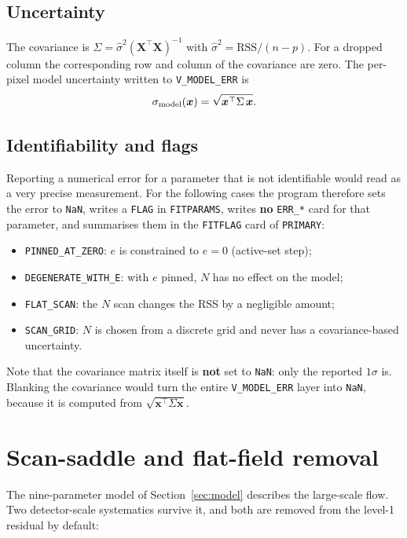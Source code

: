 \documentclass[11pt,a4paper]{article}
\newcommand{\code}[1]{\texttt{\small #1}}
\begin{document}
\subsection{Uncertainty}
The covariance is $\Sigma = \hat\sigma^2 (\bm{X}^\top\bm{X})^{-1}$ with
$\hat\sigma^2 = \mathrm{RSS}/(n-p)$.  For a dropped column the corresponding row
and column of the covariance are zero.  The per-pixel model uncertainty written
to \code{V\_MODEL\_ERR} is
\begin{equation}
  \sigma_{\rm model}(\bm{x}) = \sqrt{\bm{x}^\top \Sigma\, \bm{x}} .
\end{equation}

\subsection{Identifiability and flags}
\label{sec:ident}
Reporting a numerical error for a parameter that is not identifiable would read
as a very precise measurement.  For the following cases the program therefore
sets the error to \code{NaN}, writes a \code{FLAG} in \code{FITPARAMS}, writes
\textbf{no} \code{ERR\_*} card for that parameter, and summarises them in the
\code{FITFLAG} card of \code{PRIMARY}:
\begin{itemize}
  \item \code{PINNED\_AT\_ZERO}: $e$ is constrained to $e=0$ (active-set step);
  \item \code{DEGENERATE\_WITH\_E}: with $e$ pinned, $N$ has no effect on the model;
  \item \code{FLAT\_SCAN}: the $N$ scan changes the RSS by a negligible amount;
  \item \code{SCAN\_GRID}: $N$ is chosen from a discrete grid and never has a
        covariance-based uncertainty.
\end{itemize}
Note that the covariance matrix itself is \textbf{not} set to \code{NaN}: only
the reported $1\sigma$ is.  Blanking the covariance would turn the entire
\code{V\_MODEL\_ERR} layer into \code{NaN}, because it is computed from
$\sqrt{\bm{x}^\top\Sigma\bm{x}}$.

\section{Scan-saddle and flat-field removal}
\label{sec:correction}

The nine-parameter model of Section~\ref{sec:model} describes the large-scale
flow.  Two detector-scale systematics survive it, and both are removed from the
level-1 residual by default:
\end{document}
